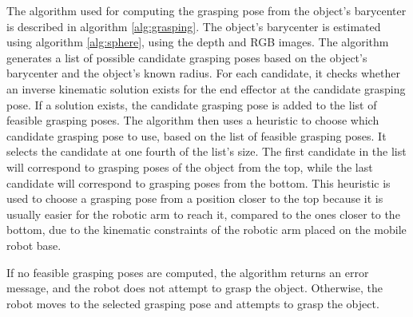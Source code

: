 The algorithm used for computing the grasping pose from the object's barycenter is described
in algorithm \ref{alg:grasping}. The object's barycenter is estimated using algorithm \ref{alg:sphere},
using the depth and RGB images. The algorithm generates a list of possible candidate grasping poses
based on the object's barycenter and the object's known radius. For each candidate, it checks whether 
an inverse kinematic solution exists for the end effector at the candidate grasping pose. 
If a solution exists, the candidate grasping pose is added to the list of feasible grasping poses.
The algorithm then uses a heuristic to choose which candidate grasping pose to use, based on the list
of feasible grasping poses. It selects the candidate at one fourth of the list's size. The first candidate in the 
list will correspond to grasping poses of the object from the top, while the last candidate will correspond
to grasping poses from the bottom. This heuristic is used to choose a grasping pose from a position closer to 
the top because it is usually easier for the robotic arm to reach it, compared to the ones closer to the bottom,
due to the kinematic constraints of the robotic arm placed on the mobile robot base.

If no feasible grasping poses are computed, the algorithm returns an error message, and the robot does not attempt
to grasp the object. Otherwise, the robot moves to the selected grasping pose and attempts to grasp the object.

